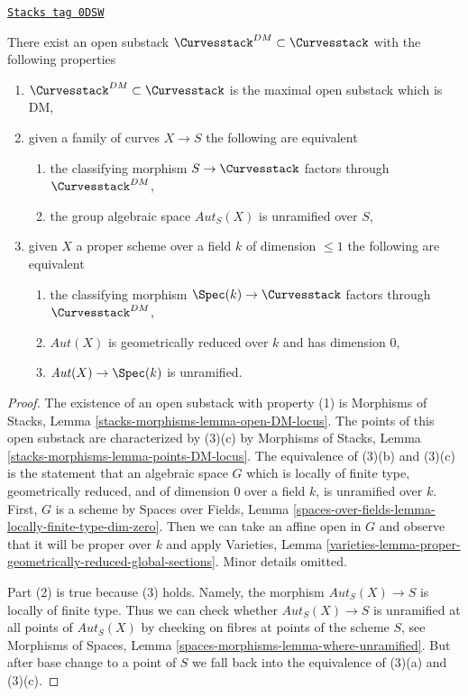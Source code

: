 \begin{lemma}[DM curves]
\label{moduli-curves-lemma-DM-curves}
\href{https://stacks.math.columbia.edu/tag/0DSW}{\texttt{Stacks tag 0DSW}}

There exist an open substack $\Curvesstack^{DM} \subset \Curvesstack$
with the following properties
\begin{enumerate}
\item $\Curvesstack^{DM} \subset \Curvesstack$ is the maximal
open substack which is DM,
\item given a family of curves $X \to S$ the following are equivalent
\begin{enumerate}
\item the classifying morphism $S \to \Curvesstack$ factors through
$\Curvesstack^{DM}$,
\item the group algebraic space $\mathit{Aut}_S(X)$ is unramified over $S$,
\end{enumerate}
\item given $X$ a proper scheme over a field $k$ of dimension $\leq 1$
the following are equivalent
\begin{enumerate}
\item the classifying morphism $\Spec(k) \to \Curvesstack$ factors
through $\Curvesstack^{DM}$,
\item $\mathit{Aut}(X)$ is geometrically reduced over $k$ and
has dimension $0$,
\item $\mathit{Aut}(X) \to \Spec(k)$ is unramified.
\end{enumerate}
\end{enumerate}
\end{lemma}

\begin{proof}
The existence of an open substack with property (1) is
Morphisms of Stacks, Lemma \ref{stacks-morphisms-lemma-open-DM-locus}.
The points of this open substack are characterized by (3)(c) by
Morphisms of Stacks, Lemma \ref{stacks-morphisms-lemma-points-DM-locus}.
The equivalence of (3)(b) and (3)(c) is the statement that an
algebraic space $G$ which is locally of finite type, geometrically reduced,
and of dimension $0$ over a field $k$, is unramified over $k$.
First, $G$ is a scheme by Spaces over Fields, Lemma
\ref{spaces-over-fields-lemma-locally-finite-type-dim-zero}.
Then we can take an affine open in $G$ and observe
that it will be proper over $k$ and apply
Varieties, Lemma
\ref{varieties-lemma-proper-geometrically-reduced-global-sections}.
Minor details omitted.

\medskip\noindent
Part (2) is true because (3) holds. Namely, the morphism
$\mathit{Aut}_S(X) \to S$ is locally of finite type. Thus we can check whether
$\mathit{Aut}_S(X) \to S$ is unramified at all points of
$\mathit{Aut}_S(X)$ by checking on fibres at points of the scheme $S$, see
Morphisms of Spaces, Lemma \ref{spaces-morphisms-lemma-where-unramified}.
But after base change to a point of $S$ we fall back into
the equivalence of (3)(a) and (3)(c).
\end{proof}

